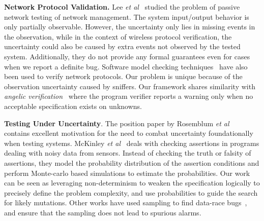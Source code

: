 \textbf{Network Protocol Validation.} Lee \textit{et al}~\cite{lee1997passive}
studied the problem of passive network testing of network management. The system
input/output behavior is only partially observable. However, the uncertainty
only lies in missing events in the observation, while in the context of wireless
protocol verification, the uncertainty could also be caused by extra events not
observed by the tested system. Additionally, they do not provide any formal
guarantees even for cases when we report a definite bug.  Software model
checking techniques~\cite{musuvathi2002cmc,godefroid1997model} have also been
used to verify network protocols. Our problem is unique because of the
observation uncertainty caused by sniffers. Our framework shares similarity
with {\it angelic verification}~\cite{das-cav15} where the program verifier
reports a warning only when no acceptable specification exists on unknowns.

\begin{comment}
\textbf{Sniffer Trace Analysis.} Wireless sniffers has been widely used to
analyze MAC layer behaviors of enterprise wireless
networks~\cite{sheng:wicom2008,tan:tmc2014,yeo-wise04,yeo:witmemo2005}.
Jigsaw~\cite{Cheng:2006:JSP:1159913.1159920} is a larger scale wireless network
monitoring infrastructure. 150~radio monitors were deployed in a campus
building. Traces collected from multiple sniffers were merged and synchronized
to restructure the link and transportation layer conversations. Protocol
specific heuristics were developed to infer the missing packets. The work
in~\cite{Mahajan:2006:AMB:1159913.1159923} shared the same idea of trace merging
with Jigsaw, but uses a FSM to infer packet reception. These works assume the
correctness of the protocol implementation in order to infer missing packets,
while we systematically encode the uncertainty of sniffer traces for
verification purpose.
\end{comment}


\textbf{ Testing Under Uncertainty}. The position paper by Rosemblum \textit{et
al}~\cite{Elbaum:2014:KUT:2635868.2666608} contains excellent motivation for the
need to combat uncertainty foundationally when testing systems. McKinley
\textit{et al}~\cite{bornholt2014uncertain,sampson2014expressing} deals with checking
assertions in programs dealing with noisy data from sensors. Instead of checking
the truth or falsity of assertions, they model the probability distribution of
the assertion conditions and perform Monte-carlo based simulations to estimate
the probabilities. Our work can be seen as leveraging non-determinism to weaken
the specification logically to precisely define the problem complexity, and use
probabilities to guide the search for likely mutations.  Other works have used
sampling to find data-race bugs~\cite{marino2009literace}, and ensure that the
sampling does not lead to spurious alarms.

